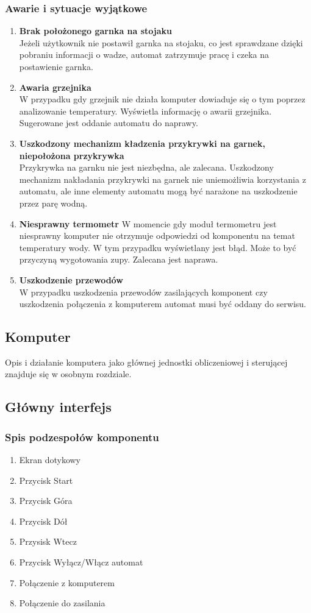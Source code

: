 \documentclass[12pt,a4paper,notitlepage]{article}
\begin{document}
\subsubsection{Awarie i sytuacje wyjątkowe}
\begin{enumerate}
  \item \textbf{Brak położonego garnka na stojaku}\\
Jeżeli użytkownik nie postawił garnka na stojaku, co jest sprawdzane dzięki pobraniu informacji o wadze, automat zatrzymuje pracę i czeka na postawienie garnka.
  \item \textbf{Awaria grzejnika}\\
W przypadku gdy grzejnik nie działa komputer dowiaduje się o tym poprzez analizowanie temperatury. Wyświetla informację o awarii grzejnika. Sugerowane jest oddanie automatu do naprawy.
  \item \textbf{Uszkodzony mechanizm kładzenia przykrywki na garnek, niepołożona przykrywka}\\
Przykrywka na garnku nie jest niezbędna, ale zalecana. Uszkodzony mechanizm nakładania przykrywki na garnek nie uniemożliwia korzystania z automatu, ale inne elementy automatu mogą być narażone na uszkodzenie przez parę wodną.
  \item \textbf{Niesprawny termometr}
W momencie gdy moduł termometru jest niesprawny komputer nie otrzymuje odpowiedzi od komponentu na temat temperatury wody. W tym przypadku wyświetlany jest błąd. Może to być przyczyną wygotowania zupy. Zalecana jest naprawa.
  \item \textbf{Uszkodzenie przewodów}\\
W przypadku uszkodzenia przewodów zasilających komponent czy uszkodzenia połączenia z komputerem automat musi być oddany do serwisu.
\end{enumerate}




\subsection{Komputer}
Opis i działanie komputera jako głównej jednostki obliczeniowej i sterującej znajduje się w osobnym rozdziale.

\subsection{Główny interfejs}
\subsubsection{Spis podzespołów komponentu}
\begin{enumerate}
  \item Ekran dotykowy
  \item Przycisk Start
  \item Przycisk Góra
  \item Przycisk Dół
  \item Przysisk Wtecz
  \item Przycisk Wyłącz/Włącz automat
  \item Połączenie z komputerem
  \item Połączenie do zasilania
\end{enumerate}
\end{document}
